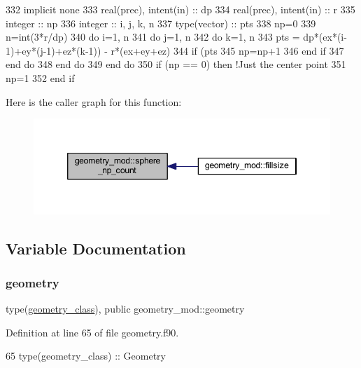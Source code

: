 \begin{DoxyCode}
332     \textcolor{keywordtype}{implicit none}
333     \textcolor{keywordtype}{real(prec)}, \textcolor{keywordtype}{intent(in)} :: dp
334     \textcolor{keywordtype}{real(prec)}, \textcolor{keywordtype}{intent(in)} :: r
335     \textcolor{keywordtype}{integer} :: np
336     \textcolor{keywordtype}{integer} :: i, j, k, n
337     \textcolor{keywordtype}{type}(vector) :: pts
338     np=0
339     n=int(3*r/dp)
340     \textcolor{keywordflow}{do} i=1, n
341         \textcolor{keywordflow}{do} j=1, n
342             \textcolor{keywordflow}{do} k=1, n
343                 pts = dp*(ex*(i-1)+ey*(j-1)+ez*(k-1)) - r*(ex+ey+ez)
344                 \textcolor{keywordflow}{if} (pts%
345                     np=np+1
346 \textcolor{keywordflow}{                end if}
347 \textcolor{keywordflow}{            end do}
348 \textcolor{keywordflow}{        end do}
349 \textcolor{keywordflow}{    end do}
350     \textcolor{keywordflow}{if} (np == 0) \textcolor{keywordflow}{then} \textcolor{comment}{!Just the center point}
351         np=1
352 \textcolor{keywordflow}{    end if}
\end{DoxyCode}
Here is the caller graph for this function\+:\nopagebreak
\begin{figure}[H]
\begin{center}
\leavevmode
\includegraphics[width=346pt]{namespacegeometry__mod_a05de7940b4e7df5a2b31f3d0414e3743_icgraph}
\end{center}
\end{figure}


\subsection{Variable Documentation}
\mbox{\label{namespacegeometry__mod_ad2ad4f7e1138beaad5f37d5c15b7b457}} 
\subsubsection{\texorpdfstring{geometry}{geometry}}
{\footnotesize\ttfamily type(\mbox{\hyperlink{structgeometry__mod_1_1geometry__class}{geometry\+\_\+class}}), public geometry\+\_\+mod\+::geometry}



Definition at line 65 of file geometry.\+f90.


\begin{DoxyCode}
65     \textcolor{keywordtype}{type}(geometry\_class) :: Geometry
\end{DoxyCode}
